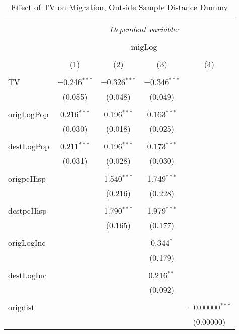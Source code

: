 
\begin{table}[!htbp] \centering 
  \caption{Effect of TV on Migration, Outside Sample Distance Dummy} 
  \label{} 
\begin{tabular}{@{\extracolsep{5pt}}lcccc} 
\\[-1.8ex]\hline 
\hline \\[-1.8ex] 
 & \multicolumn{4}{c}{\textit{Dependent variable:}} \\ 
\cline{2-5} 
\\[-1.8ex] & \multicolumn{4}{c}{migLog} \\ 
\\[-1.8ex] & (1) & (2) & (3) & (4)\\ 
\hline \\[-1.8ex] 
 TV & $-$0.246$^{***}$ & $-$0.326$^{***}$ & $-$0.346$^{***}$ &  \\ 
  & (0.055) & (0.048) & (0.049) &  \\ 
  & & & & \\ 
 origLogPop & 0.216$^{***}$ & 0.196$^{***}$ & 0.163$^{***}$ &  \\ 
  & (0.030) & (0.018) & (0.025) &  \\ 
  & & & & \\ 
 destLogPop & 0.211$^{***}$ & 0.196$^{***}$ & 0.173$^{***}$ &  \\ 
  & (0.031) & (0.028) & (0.030) &  \\ 
  & & & & \\ 
 origpcHisp &  & 1.540$^{***}$ & 1.749$^{***}$ &  \\ 
  &  & (0.216) & (0.228) &  \\ 
  & & & & \\ 
 destpcHisp &  & 1.790$^{***}$ & 1.979$^{***}$ &  \\ 
  &  & (0.165) & (0.177) &  \\ 
  & & & & \\ 
 origLogInc &  &  & 0.344$^{*}$ &  \\ 
  &  &  & (0.179) &  \\ 
  & & & & \\ 
 destLogInc &  &  & 0.216$^{**}$ &  \\ 
  &  &  & (0.092) &  \\ 
  & & & & \\ 
 origdist &  &  &  & $-$0.00000$^{***}$ \\ 
  &  &  &  & (0.00000) \\ 

\end{tabular}
\end{table}
